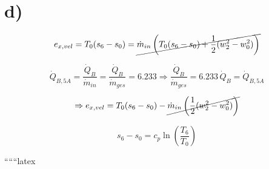 \section*{d)}

\[ e_{x,vel} = T_{0} (s_{6} - s_{0}) = \cancel{\dot{m}_{in} \left( T_{0} (s_{6} - s_{0}) + \frac{1}{2} (w_{2}^{2} - w_{0}^{2}) \right)} \]

\[ \dot{Q}_{B,5A} = \frac{\dot{Q}_{B}}{\dot{m}_{in}} = \frac{\dot{Q}_{B}}{\dot{m}_{ges}} = 6.233 \Rightarrow \frac{\dot{Q}_{B}}{\dot{m}_{ges}} = 6.233 \, \dot{Q}_{B} = \dot{Q}_{B,5A} \]

\[ \Rightarrow e_{x,vel} = T_{0} (s_{6} - s_{0}) - \cancel{\dot{m}_{in} \left( \frac{1}{2} (w_{2}^{2} - w_{0}^{2}) \right)} \]

\[ s_{6} - s_{0} = c_{p} \ln \left( \frac{T_{6}}{T_{0}} \right) \]

``````latex



